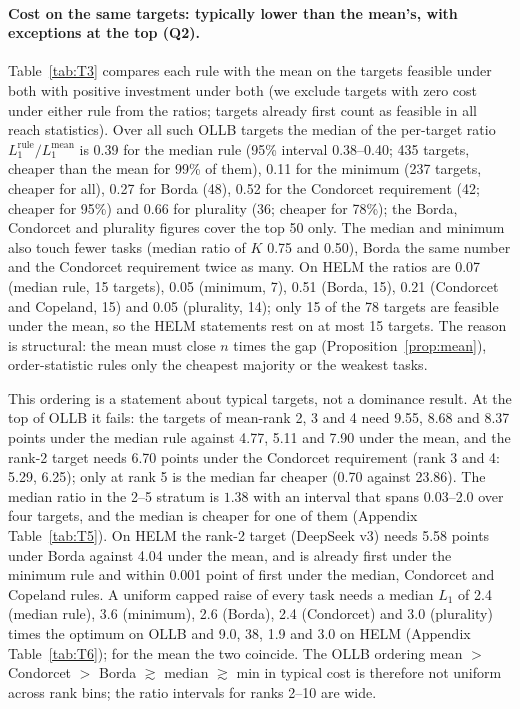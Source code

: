 \documentclass{article}
\begin{document}
\paragraph{Cost on the same targets: typically lower than the mean's, with exceptions at the top (Q2).}
Table~\ref{tab:T3} compares each rule with the mean on the targets feasible under both with positive investment under both (we exclude targets with zero cost under either rule from the ratios; targets already first count as feasible in all reach statistics). Over all such OLLB targets the median of the per-target ratio $L_1^{\text{rule}}/L_1^{\text{mean}}$ is 0.39 for the median rule (95\% interval 0.38--0.40; 435 targets, cheaper than the mean for 99\% of them), 0.11 for the minimum (237 targets, cheaper for all), 0.27 for Borda (48), 0.52 for the Condorcet requirement (42; cheaper for 95\%) and 0.66 for plurality (36; cheaper for 78\%); the Borda, Condorcet and plurality figures cover the top 50 only. The median and minimum also touch fewer tasks (median ratio of $K$ 0.75 and 0.50), Borda the same number and the Condorcet requirement twice as many. On HELM the ratios are 0.07 (median rule, 15 targets), 0.05 (minimum, 7), 0.51 (Borda, 15), 0.21 (Condorcet and Copeland, 15) and 0.05 (plurality, 14); only 15 of the 78 targets are feasible under the mean, so the HELM statements rest on at most 15 targets. The reason is structural: the mean must close $n$ times the gap (Proposition~\ref{prop:mean}), order-statistic rules only the cheapest majority or the weakest tasks.

This ordering is a statement about typical targets, not a dominance result. At the top of OLLB it fails: the targets of mean-rank 2, 3 and 4 need 9.55, 8.68 and 8.37 points under the median rule against 4.77, 5.11 and 7.90 under the mean, and the rank-2 target needs 6.70 points under the Condorcet requirement (rank 3 and 4: 5.29, 6.25); only at rank 5 is the median far cheaper (0.70 against 23.86). The median ratio in the 2--5 stratum is $1.38$ with an interval that spans 0.03--2.0 over four targets, and the median is cheaper for one of them (Appendix Table~\ref{tab:T5}). On HELM the rank-2 target (DeepSeek v3) needs 5.58 points under Borda against 4.04 under the mean, and is already first under the minimum rule and within 0.001 point of first under the median, Condorcet and Copeland rules. A uniform capped raise of every task needs a median $L_1$ of 2.4 (median rule), 3.6 (minimum), 2.6 (Borda), 2.4 (Condorcet) and 3.0 (plurality) times the optimum on OLLB and 9.0, 38, 1.9 and 3.0 on HELM (Appendix Table~\ref{tab:T6}); for the mean the two coincide. The OLLB ordering mean $>$ Condorcet $>$ Borda $\gtrsim$ median $\gtrsim$ min in typical cost is therefore not uniform across rank bins; the ratio intervals for ranks 2--10 are wide.
\end{document}
